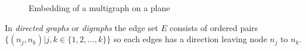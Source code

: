 \begin{figure}[h]
  \caption{Embedding of a multigraph on a plane}
  \label{fig:multi}
\end{figure}

In \textit{directed graphs} or \textit{digraphs} the edge set $ E $ consists of ordered pairs $ \{(n_j, n_k) | j,k \in \{1, 2, ..., k\}\} $ so each edges has a direction leaving node $ n_j $ to $ n_k $.


